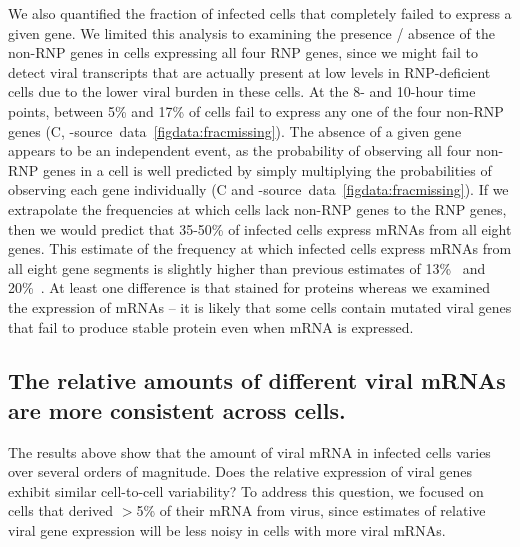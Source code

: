 \documentclass[9pt,lineno]{elife}
\begin{document}
We also quantified the fraction of infected cells that completely failed to express a given gene.
We limited this analysis to examining the presence / absence of the non-RNP genes in cells expressing all four RNP genes, since we might fail to detect viral transcripts that are actually present at low levels in RNP-deficient cells due to the lower viral burden in these cells.
At the 8- and 10-hour time points, between 5\% and 17\% of cells fail to express any one of the four non-RNP genes (C, -source~data~\ref{figdata:fracmissing}).
The absence of a given gene appears to be an independent event, as the probability of observing all four non-RNP genes in a cell is well predicted by simply multiplying the probabilities of observing each gene individually (C and -source~data~\ref{figdata:fracmissing}). 
If we extrapolate the frequencies at which cells lack non-RNP genes to the RNP genes, then we would predict that 35-50\% of infected cells express mRNAs from all eight genes.
This estimate of the frequency at which infected cells express mRNAs from all eight gene segments is slightly higher than previous estimates of 13\%~\citep{Brooke:2013kb} and 20\%~\citep{Dou:2017cp}.
At least one difference is that \citet{Brooke:2013kb} stained for proteins whereas we examined the expression of mRNAs -- it is likely that some cells contain mutated viral genes that fail to produce stable protein even when mRNA is expressed.
	
\subsection{The relative amounts of different viral mRNAs are more consistent across cells.}
The results above show that the amount of viral mRNA in infected cells varies over several orders of magnitude.
Does the relative expression of viral genes exhibit similar cell-to-cell variability?
To address this question, we focused on cells that derived $>$5\% of their mRNA from virus, since estimates of relative viral gene expression will be less noisy in cells with more viral mRNAs.
\end{document}
